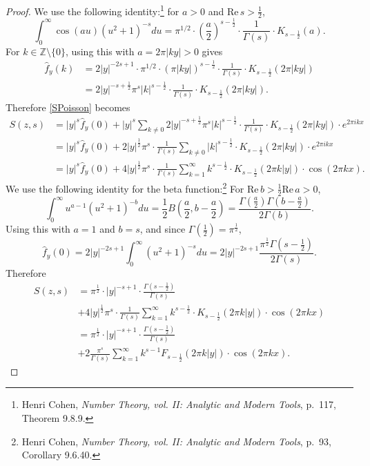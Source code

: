 \documentclass{article}
\def\Re{\ensuremath{\mathrm{Re}}\,}
\theoremstyle{definition}
\begin{document}
\begin{proof}
We use the following identity:\footnote{Henri Cohen, {\em Number Theory, vol. II: Analytic and Modern Tools}, p.~117, Theorem 9.8.9.}
for $a>0$ and $\Re s>\frac{1}{2}$,
\[
\int_0^\infty \cos(au) (u^2+1)^{-s} du = \pi^{1/2} \cdot \left(\frac{a}{2}\right)^{s-\frac{1}{2}} \cdot \frac{1}{\Gamma(s)} \cdot
K_{s-\frac{1}{2}}(a).
\]
For $k \in \mathbb{Z} \setminus \{0\}$, 
using this with  $a=2\pi |k y|>0$ gives
\begin{align*}
\widehat{f}_y(k) &= 2|y|^{-2s+1} \cdot \pi^{1/2} \cdot ( \pi |k y|)^{s-\frac{1}{2}} \cdot \frac{1}{\Gamma(s)} \cdot K_{s-\frac{1}{2}}(2\pi |k y|)\\
&=2|y|^{-s+\frac{1}{2}} \pi^s |k|^{s-\frac{1}{2}} \cdot \frac{1}{\Gamma(s)} \cdot K_{s-\frac{1}{2}}(2\pi |k y|).
\end{align*}
Therefore \eqref{SPoisson} becomes
\begin{align*}
S(z,s) &= |y|^s\widehat{f}_y(0) + |y|^s \sum_{k \neq 0} 
2|y|^{-s+\frac{1}{2}} \pi^s |k|^{s-\frac{1}{2}} \cdot \frac{1}{\Gamma(s)} \cdot K_{s-\frac{1}{2}}(2\pi |k y|)
\cdot e^{2\pi ikx}\\
&=|y|^s \widehat{f}_y(0) + 2|y|^{\frac{1}{2}} \pi^s \cdot \frac{1}{\Gamma(s)}
\sum_{k \neq 0} |k|^{s-\frac{1}{2}} \cdot K_{s-\frac{1}{2}}(2\pi |k y|)
\cdot e^{2\pi ikx}\\
&=|y|^s \widehat{f}_y(0) + 4|y|^{\frac{1}{2}} \pi^s \cdot \frac{1}{\Gamma(s)} \sum_{k=1}^\infty k^{s-\frac{1}{2}} \cdot K_{s-\frac{1}{2}}(2\pi k |y|)
\cdot \cos(2\pi kx).
\end{align*}
We use the following identity for the beta function:\footnote{Henri Cohen, {\em Number Theory, vol. II: Analytic and Modern Tools}, p.~93, Corollary
9.6.40.}
For $\Re b>\frac{1}{2}\Re a>0$, 
\[
\int_0^\infty u^{a-1} (u^2+1)^{-b} du = \frac{1}{2}B\left(\frac{a}{2},b-\frac{a}{2}\right)
=\frac{\Gamma\left(\frac{a}{2}\right) \Gamma\left(b-\frac{a}{2}\right)}{2\Gamma(b)}.
\]
Using this with $a=1$ and $b=s$, and since $\Gamma\left(\frac{1}{2}\right)=\pi^{\frac{1}{2}}$,
\[
\widehat{f}_y(0)=2|y|^{-2s+1} \int_0^\infty (u^2+1)^{-s} du
=2|y|^{-2s+1} \frac{\pi^{\frac{1}{2}} \Gamma\left(s-\frac{1}{2}\right)}{2\Gamma(s)}.
\]
Therefore
\begin{align*}
S(z,s)&=\pi^{\frac{1}{2}} \cdot |y|^{-s+1} \cdot  \frac{ \Gamma\left(s-\frac{1}{2}\right)}{\Gamma(s)}\\
&
+ 4|y|^{\frac{1}{2}} \pi^s \cdot \frac{1}{\Gamma(s)} \sum_{k=1}^\infty k^{s-\frac{1}{2}} \cdot K_{s-\frac{1}{2}}(2\pi k |y|)
\cdot \cos(2\pi kx)\\
&=\pi^{\frac{1}{2}} \cdot |y|^{-s+1} \cdot  \frac{ \Gamma\left(s-\frac{1}{2}\right)}{\Gamma(s)}\\
&+2 \frac{\pi^s}{\Gamma(s)} \sum_{k=1}^\infty k^{s-1} F_{s-\frac{1}{2}}(2\pi k|y|) \cdot \cos(2\pi kx).
\end{align*}


\end{proof}
\end{document}
